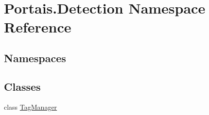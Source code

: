 \hypertarget{namespace_portais_1_1_detection}{}\section{Portais.\+Detection Namespace Reference}
\label{namespace_portais_1_1_detection}
\subsection*{Namespaces}
\begin{DoxyCompactItemize}
\end{DoxyCompactItemize}
\subsection*{Classes}
\begin{DoxyCompactItemize}
\item 
class \hyperlink{class_portais_1_1_detection_1_1_tag_manager}{Tag\+Manager}
\end{DoxyCompactItemize}
